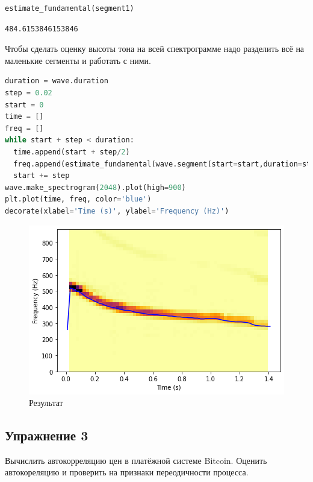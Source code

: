 \begin{lstlisting}[language=Python]
estimate_fundamental(segment1)
\end{lstlisting}
\begin{lstlisting}
484.6153846153846
\end{lstlisting}

Чтобы сделать оценку высоты тона на всей спектрограмме надо разделить всё на маленькие сегменты и работать с ними.

\begin{lstlisting}[language=Python]
duration = wave.duration
step = 0.02
start = 0
time = []
freq = []
while start + step < duration:
  time.append(start + step/2)
  freq.append(estimate_fundamental(wave.segment(start=start,duration=step)))
  start += step
wave.make_spectrogram(2048).plot(high=900)
plt.plot(time, freq, color='blue')
decorate(xlabel='Time (s)', ylabel='Frequency (Hz)')
\end{lstlisting}
\begin{figure}[H]
	\begin{center}
		\includegraphics[scale=1]{fig/lab05/lab05_22_0.png}
		\caption{Результат}
	\end{center}
\end{figure}

\subsection{Упражнение 3}

Вычислить автокорреляцию цен в платёжной системе Bitcoin. Оценить автокореляцию и проверить на признаки переодичности процесса.

